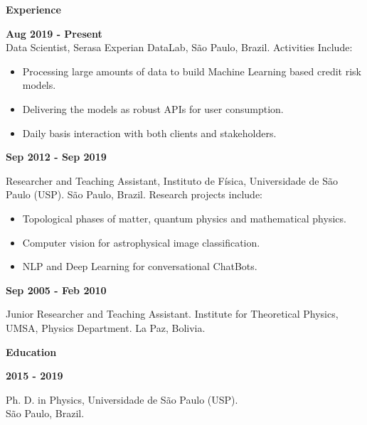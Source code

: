 \documentclass[a4paper,12pt,final]{memoir}
\newcommand{\SmallSep}{\vspace{0.5em}}
\newcommand{\CVSection}[1]
	{\Large\textbf{#1}\par
	\SmallSep\normalsize\normalfont}
\newcommand{\CVItem}[1]
	{\textbf{\color{RoyalBlue} #1}}
\begin{document}
\vspace{-15pt} 
\CVSection{Experience}
\CVItem{Aug 2019 - Present}\\
{\small Data Scientist, Serasa Experian DataLab, São Paulo, Brazil. Activities Include:}
\begin{footnotesize}
\begin{itemize}
\item Processing large amounts of data to build Machine Learning based credit risk models.
\item Delivering the models as robust APIs for user consumption.
\item Daily basis interaction with both clients and stakeholders.
\end{itemize}
\end{footnotesize}
\SmallSep

\CVItem{Sep 2012 - Sep 2019}\\
\begin{small}
Researcher and Teaching Assistant,  Instituto de F\'{i}sica, Universidade de S\~{a}o Paulo 
(USP). S\~{a}o Paulo, Brazil. 
Research projects include: 
\end{small}
\begin{footnotesize}
\begin{itemize}
\item Topological phases of matter, quantum physics and mathematical physics.
\item Computer vision for astrophysical image classification.
\item NLP and Deep Learning for conversational ChatBots.
\end{itemize}
\end{footnotesize}

\SmallSep


\CVItem{Sep 2005 - Feb 2010}\\
\begin{small}
Junior Researcher and Teaching Assistant. Institute for Theoretical Physics,
UMSA, Physics Department. La Paz, Bolivia. 
\end{small}

\SmallSep

\CVSection{Education}
\CVItem{2015 - 2019}\\
\begin{small}
 Ph. D. in Physics, Universidade de S\~{a}o Paulo (USP).\\ 
S\~{a}o Paulo, Brazil.
 \end{small} 
\SmallSep
\end{document}
